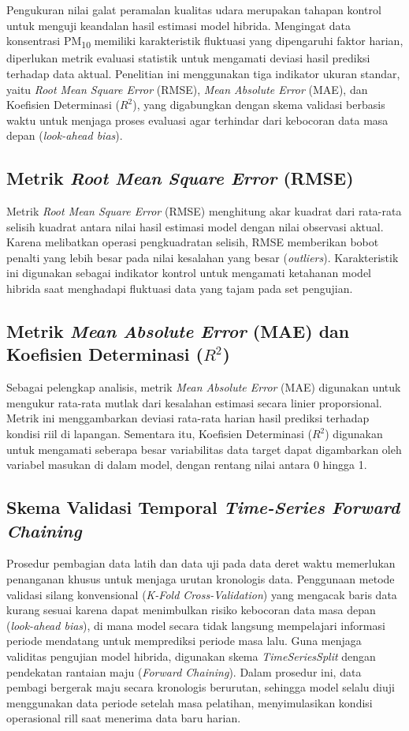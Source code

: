 Pengukuran nilai galat peramalan kualitas udara merupakan tahapan kontrol untuk menguji keandalan hasil estimasi model hibrida. Mengingat data konsentrasi PM\textsubscript{10} memiliki karakteristik fluktuasi yang dipengaruhi faktor harian, diperlukan metrik evaluasi statistik untuk mengamati deviasi hasil prediksi terhadap data aktual. Penelitian ini menggunakan tiga indikator ukuran standar, yaitu \textit{Root Mean Square Error} (RMSE), \textit{Mean Absolute Error} (MAE), dan Koefisien Determinasi ($R^2$), yang digabungkan dengan skema validasi berbasis waktu untuk menjaga proses evaluasi agar terhindar dari kebocoran data masa depan (\textit{look-ahead bias}).

\subsection{Metrik \textit{Root Mean Square Error} (RMSE)}

Metrik \textit{Root Mean Square Error} (RMSE) menghitung akar kuadrat dari rata-rata selisih kuadrat antara nilai hasil estimasi model dengan nilai observasi aktual. Karena melibatkan operasi pengkuadratan selisih, RMSE memberikan bobot penalti yang lebih besar pada nilai kesalahan yang besar (\textit{outliers}). Karakteristik ini digunakan sebagai indikator kontrol untuk mengamati ketahanan model hibrida saat menghadapi fluktuasi data yang tajam pada set pengujian.

\subsection{Metrik \textit{Mean Absolute Error} (MAE) dan Koefisien Determinasi ($R^2$)}

Sebagai pelengkap analisis, metrik \textit{Mean Absolute Error} (MAE) digunakan untuk mengukur rata-rata mutlak dari kesalahan estimasi secara linier proporsional. Metrik ini menggambarkan deviasi rata-rata harian hasil prediksi terhadap kondisi riil di lapangan. Sementara itu, Koefisien Determinasi ($R^2$) digunakan untuk mengamati seberapa besar variabilitas data target dapat digambarkan oleh variabel masukan di dalam model, dengan rentang nilai antara 0 hingga 1.

\subsection{Skema Validasi Temporal \textit{Time-Series Forward Chaining}}

Prosedur pembagian data latih dan data uji pada data deret waktu memerlukan penanganan khusus untuk menjaga urutan kronologis data. Penggunaan metode validasi silang konvensional (\textit{K-Fold Cross-Validation}) yang mengacak baris data kurang sesuai karena dapat menimbulkan risiko kebocoran data masa depan (\textit{look-ahead bias}), di mana model secara tidak langsung mempelajari informasi periode mendatang untuk memprediksi periode masa lalu. Guna menjaga validitas pengujian model hibrida, digunakan skema \textit{TimeSeriesSplit} dengan pendekatan rantaian maju (\textit{Forward Chaining}). Dalam prosedur ini, data pembagi bergerak maju secara kronologis berurutan, sehingga model selalu diuji menggunakan data periode setelah masa pelatihan, menyimulasikan kondisi operasional rill saat menerima data baru harian.